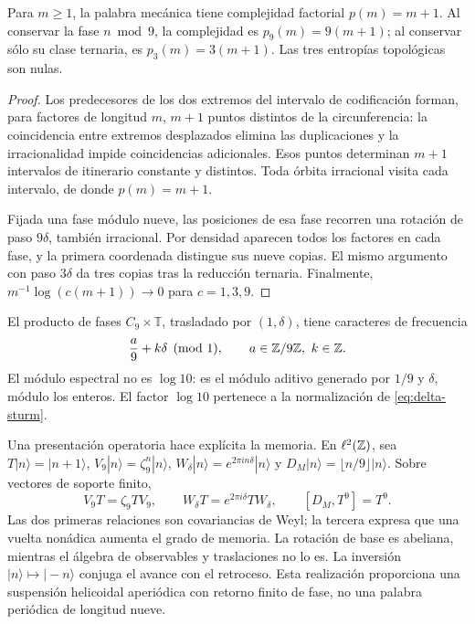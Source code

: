 \begin{theorem}
Para \(m\ge1\), la palabra mecánica tiene complejidad factorial \(p(m)=m+1\). Al conservar la fase \(n\bmod9\), la complejidad es \(p_9(m)=9(m+1)\); al conservar sólo su clase ternaria, es \(p_3(m)=3(m+1)\). Las tres entropías topológicas son nulas.
\end{theorem}
\begin{proof}
Los predecesores de los dos extremos del intervalo de codificación forman, para factores de longitud \(m\), \(m+1\) puntos distintos de la circunferencia: la coincidencia entre extremos desplazados elimina las duplicaciones y la irracionalidad impide coincidencias adicionales. Esos puntos determinan \(m+1\) intervalos de itinerario constante y distintos. Toda órbita irracional visita cada intervalo, de donde \(p(m)=m+1\).

Fijada una fase módulo nueve, las posiciones de esa fase recorren una rotación de paso \(9\delta\), también irracional. Por densidad aparecen todos los factores en cada fase, y la primera coordenada distingue sus nueve copias. El mismo argumento con paso \(3\delta\) da tres copias tras la reducción ternaria. Finalmente, \(m^{-1}\log(c(m+1))\to0\) para \(c=1,3,9\).
\end{proof}

El producto de fases \(C_9\times\mathbb T\), trasladado por \((1,\delta)\), tiene caracteres de frecuencia
\[
 \frac a9+k\delta\pmod1,\qquad a\in\mathbb Z/9\mathbb Z,\ k\in\mathbb Z.
\]
El módulo espectral no es \(\log10\): es el módulo aditivo generado por \(1/9\) y \(\delta\), módulo los enteros. El factor \(\log10\) pertenece a la normalización de \eqref{eq:delta-sturm}.

Una presentación operatoria hace explícita la memoria. En \(\ell^2(\mathbb Z)\), sea \(T|n\rangle=|n+1\rangle\), \(V_9|n\rangle=\zeta_9^n|n\rangle\), \(W_\delta|n\rangle=e^{2\pi i n\delta}|n\rangle\) y \(D_M|n\rangle=\lfloor n/9\rfloor|n\rangle\). Sobre vectores de soporte finito,
\begin{equation}
 V_9T=\zeta_9TV_9,\qquad
 W_\delta T=e^{2\pi i\delta}TW_\delta,\qquad
 [D_M,T^9]=T^9.
 \label{eq:weyl-relojes}
\end{equation}
Las dos primeras relaciones son covariancias de Weyl; la tercera expresa que una vuelta nonádica aumenta el grado de memoria. La rotación de base es abeliana, mientras el álgebra de observables y traslaciones no lo es. La inversión \(|n\rangle\mapsto|-n\rangle\) conjuga el avance con el retroceso. Esta realización proporciona una suspensión helicoidal aperiódica con retorno finito de fase, no una palabra periódica de longitud nueve.

